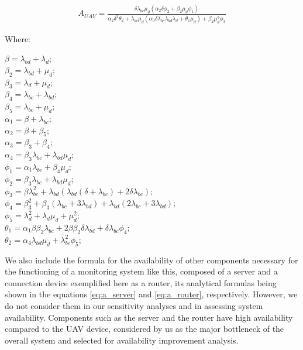 \documentclass[conference]{IEEEtran}
\begin{document}
\begin{align}\label{eq:a_uav}
A_{UAV} = \frac{\delta  \lambda_{bc} \mu_{d} (\alpha_{2} \delta \phi_{2} + \beta_{2} \mu_{d} \phi_{1})}{ \alpha_{2} \delta^{2} \theta_{2} + \lambda_{bc} \mu_{d} (\alpha_{3} \delta  \lambda_{bc} \lambda_{bd} \lambda_{d} + \theta_{1} \mu_{d})+ \beta_{2} \mu_{d}^{3} \phi_{3}}
\end{align}

Where: \\

\begin{minipage}{.8\textwidth}%
\(\beta = \lambda_{bd} + \lambda_{d};\) \\
\(\beta_{2} = \lambda_{bd} + \mu_{d};\) \\
\(\beta_{3} = \lambda_{d} + \mu_{d};\) \\
\(\beta_{4} = \lambda_{bc} + \lambda_{bd};\) \\
\(\beta_{5} = \lambda_{bc} + \mu_{d};\) \\
\(\alpha_{1} = \beta + \lambda_{bc};\) \\
\(\alpha_{2} = \beta + \beta_{5};\) \\
\(\alpha_{3} = \beta_{3} + \beta_{4};\) \\
\(\alpha_{4} = \beta_{3}\lambda_{bc} + \lambda_{bd} \mu_{d};\) \\
\(\phi_{1} = \alpha_{1}\lambda_{bc} + \beta_{4} \mu_{d};\) \\
\(\phi_{2} = \beta_{3}\lambda_{bc} + \lambda_{bd} \mu_{d};\) \\
\(\phi_{3} = \beta \lambda_{bc}^{2} + \lambda_{bd} (\lambda_{bd} (\delta + \lambda_{bc}) + 2 \delta \lambda_{bc});\) \\
\(\phi_{4} = \beta_{3}^{2} + \beta_{3} (\lambda_{bc} + 3 \lambda_{bd}) + \lambda_{bd} (2 \lambda_{bc} + 3 \lambda_{bd});\) \\
\(\phi_{5} = \lambda_{d}^{2} + \lambda_{d} \mu_{d} + \mu_{d}^{2} ;\) \\
\(\theta_{1} = \alpha_{1} \beta  \beta_{2} \lambda_{bc} + 2 \beta  \beta_{2}  \delta \lambda_{bd}+ \delta  \lambda_{bc} \phi_{4};\) \\
\(\theta_{2} =  \alpha_{4} \lambda_{bd} \mu_{d} + \lambda_{bc}^{2} \phi_{5};\) \\
\end{minipage}%

We also include the formula for the availability of other components necessary for the functioning of a monitoring system like this, composed of a server and a connection device exemplified here as a router, its analytical formulas being shown in the equations \ref{eq:a_server} and \ref{eq:a_router}, respectively. However, we do not consider them in our sensitivity analyses and in assessing system availability. Components such as the server and the router have high availability compared to the UAV device, considered by us as the major bottleneck of the overall system and selected for availability improvement analysis.
\end{document}
